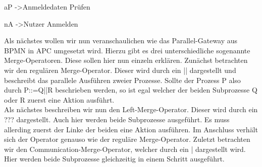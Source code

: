 aP ->Anmeldedaten Prüfen

nA ->Nutzer Anmelden

Als nächstes wollen wir nun veranschaulichen wie das Parallel-Gateway aus BPMN in APC umgesetzt wird. Hierzu gibt es drei unterschiedliche sogenannte Merge-Operatoren. Diese sollen hier nun einzeln erklären.
Zunächst betrachten wir den regulären Merge-Operator. Dieser wird durch ein || dargestellt und beschreibt das parallele Ausführen zweier Prozesse. Sollte der Prozess P also durch P::=Q||R beschrieben werden, so ist egal welcher der beiden Subprozesse Q oder R zuerst eine Aktion ausführt.\\
Als nächstes beschreiben wir nun den Left-Merge-Operator. Dieser wird durch ein ??? dargestellt. Auch hier werden beide Subprozesse ausgeführt. Es muss allerding zuerst der Linke der beiden eine Aktion ausführen. Im Anschluss verhält sich der Operator genauso wie der reguläre Merge-Operator. Zuletzt betrachten wir den Communication-Merge-Operator, welcher durch ein | dargestellt wird. Hier werden beide Subprozesse gleichzeitig in einem Schritt ausgeführt. 


